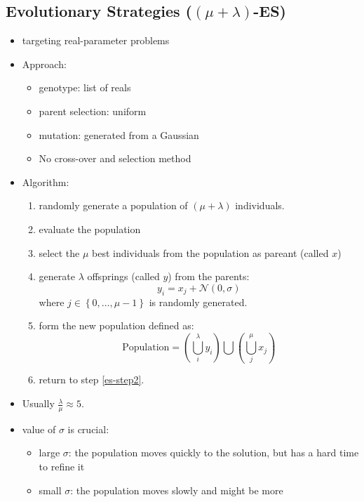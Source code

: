 \documentclass[twocolumn,landscape,10pt]{article}
\theoremstyle{definition}
\begin{document}
\subsection{Evolutionary Strategies ($(\mu+\lambda)$-ES)}

\begin{itemize}
    \item targeting real-parameter problems
    \item Approach:
        \begin{itemize}
            \item genotype: list of reals
            \item parent selection: uniform
            \item mutation: generated from a Gaussian
            \item No cross-over and selection method
        \end{itemize} 
    \item Algorithm:
        \begin{enumerate}
            \item randomly generate a population of $(\mu+\lambda)$ individuals.
            \item \label{es-step2} evaluate the population
            \item select the $\mu$ best individuals from the population as
                pareant (called $x$)
            \item generate $\lambda$ offsprings (called $y$) from the parents:
                \[
                    y_i=x_j + \mathcal{N}(0,\sigma)
                \]
                where $j\in\left\{0,\ldots,\mu-1\right\}$ is randomly generated.
            \item form the new population defined as:
                \[
                    \text{Population}=\left(\bigcup_i^\lambda y_i\right)\bigcup
                    \left(\bigcup_j^\mu x_j\right)
                \]
            \item return to step \ref{es-step2}.
        \end{enumerate} 
    \item Usually $\frac{\lambda}{\mu}\approx 5$.
    \item value of $\sigma$ is crucial:
        \begin{itemize}
            \item large $\sigma$: the population moves quickly to the solution,
                but has a hard time to refine it
            \item small $\sigma$: the population moves slowly and might be more

\end{itemize}
\end{itemize}
\end{document}

